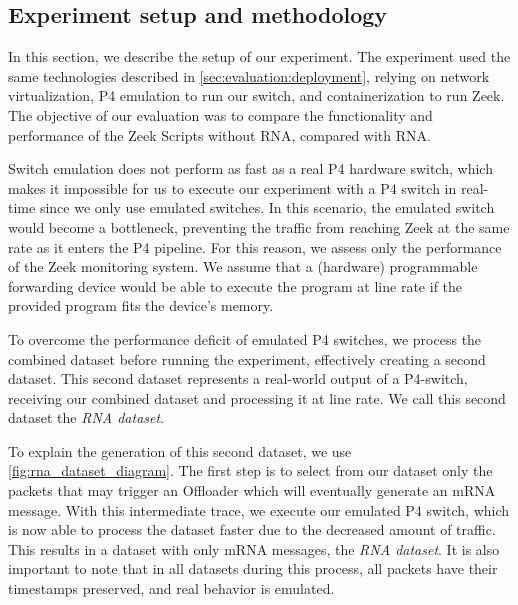 


\subsection{Experiment setup and methodology}
\label{sec:evaluation:setup}

In this section, we describe the setup of our experiment. The experiment used the same technologies described in \autoref{sec:evaluation:deployment}, relying on network virtualization, P4 emulation to run our switch, and containerization to run Zeek. The objective of our evaluation was to compare the functionality and performance of the Zeek Scripts without RNA, compared with RNA.

Switch emulation does not perform as fast as a real P4 hardware switch, which makes it impossible for us to execute our experiment with a P4 switch in real-time since we only use emulated switches. In this scenario, the emulated switch would become a bottleneck, preventing the traffic from reaching Zeek at the same rate as it enters the P4 pipeline. For this reason, we assess only the performance of the Zeek monitoring system. We assume that a (hardware) programmable forwarding device would be able to execute the program at line rate if the provided program fits the device's memory.

To overcome the performance deficit of emulated P4 switches, we process the combined dataset before running the experiment, effectively creating a second dataset. This second dataset represents a real-world output of a P4-switch, receiving our combined dataset and processing it at line rate. We call this second dataset the \textit{RNA dataset}.

To explain the generation of this second dataset, we use \autoref{fig:rna_dataset_diagram}. The first step is to select from our dataset only the packets that may trigger an Offloader which will eventually generate an mRNA message. With this intermediate trace, we execute our emulated P4 switch, which is now able to process the dataset faster due to the decreased amount of traffic. This results in a dataset with only mRNA messages, the \textit{RNA dataset}. It is also important to note that in all datasets during this process, all packets have their timestamps preserved, and real behavior is emulated.

